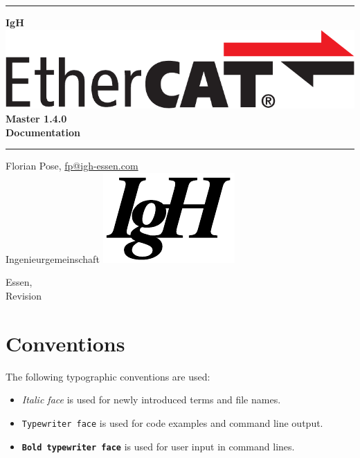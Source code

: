 \documentclass[a4paper,12pt,BCOR6mm,bibtotoc,idxtotoc]{scrbook}
\makeatletter
\renewcommand*{\lstlistoflistings}{%
  \begingroup
    \if@twocolumn
      \@restonecoltrue\onecolumn
    \else
      \@restonecolfalse
    \fi
    \lol@heading
    \setlength{\parskip}{\z@}%
    \setlength{\parindent}{\z@}%
    \setlength{\parfillskip}{\z@ \@plus 1fil}%
    \@starttoc{lol}%
    \if@restonecol\twocolumn\fi
  \endgroup
}
\newcommand{\IgH}{\raisebox{-0.7667ex}
  {\includegraphics[height=2.2ex]{images/ighsign}}}
\newcommand{\masterversion}{1.4.0}
\makeatother
\begin{document}
\pagestyle{empty}

\begin{titlepage}
  \begin{center}
    \rule{\textwidth}{1.5mm}

    {\Huge\bf IgH \includegraphics[height=2.4ex]{images/ethercat}
      Master \masterversion\\[1ex]
      Documentation}

    \vspace{1ex}
    \rule{\textwidth}{1.5mm}

    \vspace{\fill}
    {\Large Florian Pose, \url{fp@igh-essen.com}\\[1ex]
      Ingenieurgemeinschaft \IgH}

    \vspace{\fill}
    {\Large Essen, \SVNDate\\[1ex]
      Revision \SVNRevision}
  \end{center}
\end{titlepage}


\tableofcontents
\listoftables
\listoffigures
\lstlistoflistings


\newpage
\pagestyle{scrheadings}

\section*{Conventions}

The following typographic conventions are used:

\begin{itemize}

\item \textit{Italic face} is used for newly introduced terms and file names.

\item \texttt{Typewriter face} is used for code examples and command line
output.

\item \texttt{\textbf{Bold typewriter face}} is used for user input in command
lines.

\end{itemize}
\end{document}
